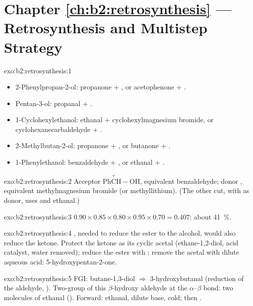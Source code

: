 \section*{Chapter \ref{ch:b2:retrosynthesis} --- Retrosynthesis and Multistep Strategy}

\begin{solution}{exo:b2:retrosynthesis:1}
\begin{itemize}
  \item 2-Phenylpropan-2-ol: propanone + , or acetophenone + .
  \item Pentan-3-ol: propanal + .
  \item 1-Cyclohexylethanol: ethanal + cyclohexylmagnesium bromide, or cyclohexanecarbaldehyde +
        .
  \item 2-Methylbutan-2-ol: propanone + , or butanone + .
  \item 1-Phenylethanol: benzaldehyde + , or ethanal + .
\end{itemize}
\end{solution}

\begin{solution}{exo:b2:retrosynthesis:2}
Acceptor  $\mathrm{Ph\overset{+}{C}H{-}OH}$, equivalent benzaldehyde; donor  ,
equivalent methylmagnesium bromide (or methyllithium). (The other cut, with  as donor, uses
 and ethanal.)
\end{solution}

\begin{solution}{exo:b2:retrosynthesis:3}
$0.90 \times 0.85 \times 0.80 \times 0.95 \times 0.70 = 0.407$: about 41~\%.
\end{solution}

\begin{solution}{exo:b2:retrosynthesis:4}
, needed to reduce the ester to the alcohol, would also reduce the ketone. Protect the
ketone as its cyclic acetal (ethane-1,2-diol, acid catalyst, water removed); reduce the ester with
; remove the acetal with dilute aqueous acid: 5-hydroxypentan-2-one.
\end{solution}

\begin{solution}{exo:b2:retrosynthesis:5}
FGI: butane-1,3-diol $\Rightarrow$ 3-hydroxybutanal (reduction of the aldehyde, ). Two-group
 of this $\beta$-hydroxy aldehyde at the $\alpha$--$\beta$ bond: two molecules of ethanal
(). Forward: ethanal, dilute base, cold; then .
\end{solution}

